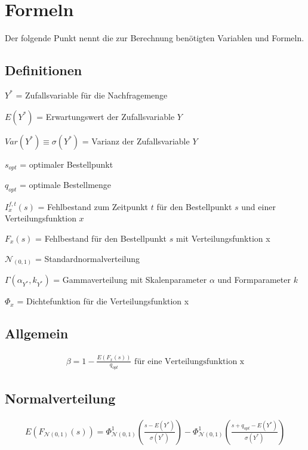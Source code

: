 \section{Formeln}
Der folgende Punkt nennt die zur Berechnung benötigten Variablen und Formeln.
\subsection{Definitionen}
\(Y^*\) = Zufallsvariable für die Nachfragemenge

\(E(Y^*)\) = Erwartungswert der Zufallsvariable $Y$

\(Var(Y^*) \equiv \sigma(Y^*)\) = Varianz der Zufallsvariable $Y$

\(s_{opt}\) = optimaler Bestellpunkt

\(q_{opt}\) = optimale Bestellmenge

\(I^{f, t}_{x}(s)\) = Fehlbestand zum Zeitpunkt \(t\) für den Bestellpunkt \(s\) und einer Verteilungsfunktion \(x\) 

\(F_x(s)\) = Fehlbestand für den Bestellpunkt \(s\) mit Verteilungsfunktion x 

\(\mathcal{N}_{(0,1)}\) = Standardnormalverteilung

\(\Gamma(\alpha_{Y^*}, k_{Y^*})\) = Gammaverteilung mit Skalenparameter \(\alpha\) und Formparameter \(k\)

\(\Phi_x\) = Dichtefunktion für die Verteilungsfunktion x

\subsection{Allgemein}
\begin{gather*}
\beta = 1-\frac{E\left(F_{x}(s)\right)}{q_{opt}} \text{ für eine Verteilungsfunktion x}
\end{gather*}
\subsection{Normalverteilung}
\begin{gather*}
E\left(F_{\mathcal{N}(0,1)}(s)\right)=\Phi^1_{\mathcal{N}(0,1)}\left(\frac{s-E(Y^*)}{\sigma(Y^*)}\right)-\Phi^1_{\mathcal{N}(0,1)}\left(\frac{s+q_{opt}-E(Y^*)}{\sigma(Y^*)}\right) \\
\end{gather*}
